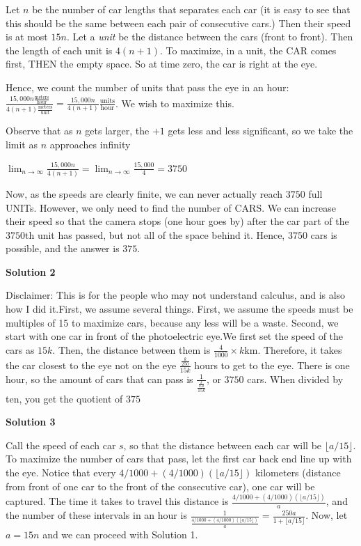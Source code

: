 \begin{enumerate}
Let $n$ be the number of car lengths that separates each car (it is easy to see that this should be the same between each pair of consecutive cars.) Then their speed is at most $15n$. Let a \textit{unit} be the distance between the cars (front to front). Then the length of each unit is $4(n + 1)$. To maximize, in a unit, the CAR comes first, THEN the empty space. So at time zero, the car is right at the eye.

 Hence, we count the number of units that pass the eye in an hour: $\frac {15,000n\frac{\text{meters}}{\text{hour}}}{4(n + 1)\frac{\text{meters}}{\text{unit}}} = \frac {15,000n}{4(n + 1)}\frac{\text{units}}{\text{hour}}$. We wish to maximize this.

 Observe that as $n$ gets larger, the $+ 1$ gets less and less significant, so we take the limit as $n$ approaches infinity

 $\lim_{n\rightarrow \infty}\frac {15,000n}{4(n + 1)} = \lim_{n\rightarrow \infty}\frac {15,000}{4} = 3750$

 Now, as the speeds are clearly finite, we can never actually reach $3750$ full UNITs. However, we only need to find the number of CARS. We can increase their speed so that the camera stops (one hour goes by) after the car part of the $3750$th unit has passed, but not all of the space behind it. Hence, $3750$ cars is possible, and the answer is $\boxed {375}$.

 



\textbf{Solution 2}

Disclaimer: This is for the people who may not understand calculus, and is also how I did it.First, we assume several things. First, we assume the speeds must be multiples of 15 to maximize cars, because any less will be a waste. Second, we start with one car in front of the photoelectric eye.We first set the speed of the cars as $15k$. Then, the distance between them is $\frac{4}{1000} \times k\text{km}$. Therefore, it takes the car closest to the eye not on the eye $\frac{\frac{k}{250}}{15k}$ hours to get to the eye. There is one hour, so the amount of cars that can pass is $\frac{1}{\frac{\frac{k}{250}}{15k}}$, or $3750$ cars. When divided by ten, you get the quotient of $\boxed{375}$




\textbf{Solution 3}

Call the speed of each car $s$, so that the distance between each car will be $\lfloor a/15 \rfloor$. To maximize the number of cars that pass, let the first car back end line up with the eye. Notice that every $4/1000+ (4/1000)(\lfloor a/15 \rfloor)$ kilometers (distance from front of one car to the front of the consecutive car), one car will be captured. The time it takes to travel this distance is $\frac{4/1000+(4/1000)(\lfloor a/15 \rfloor)}{a}$, and the number of these intervals in an hour is $\frac{1}{\frac{4/1000+(4/1000)(\lfloor a/15 \rfloor)}{a}}=\frac{250a}{1+\lfloor a/15 \rfloor}$. Now, let $a=15n$ and we can proceed with Solution 1.


\end{enumerate}
